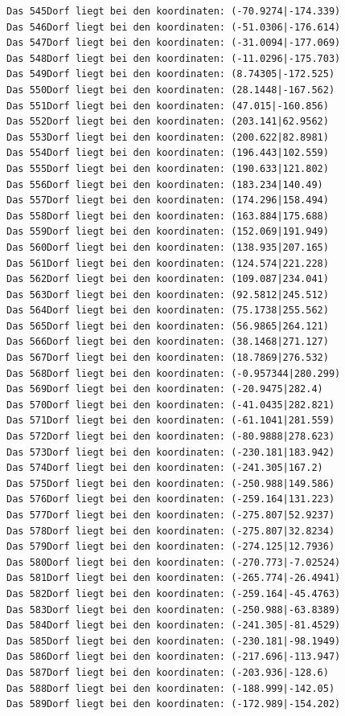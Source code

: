 \documentclass{article}
\begin{document}
\begin{verbatim}
Das 545Dorf liegt bei den koordinaten: (-70.9274|-174.339)
Das 546Dorf liegt bei den koordinaten: (-51.0306|-176.614)
Das 547Dorf liegt bei den koordinaten: (-31.0094|-177.069)
Das 548Dorf liegt bei den koordinaten: (-11.0296|-175.703)
Das 549Dorf liegt bei den koordinaten: (8.74305|-172.525)
Das 550Dorf liegt bei den koordinaten: (28.1448|-167.562)
Das 551Dorf liegt bei den koordinaten: (47.015|-160.856)
Das 552Dorf liegt bei den koordinaten: (203.141|62.9562)
Das 553Dorf liegt bei den koordinaten: (200.622|82.8981)
Das 554Dorf liegt bei den koordinaten: (196.443|102.559)
Das 555Dorf liegt bei den koordinaten: (190.633|121.802)
Das 556Dorf liegt bei den koordinaten: (183.234|140.49)
Das 557Dorf liegt bei den koordinaten: (174.296|158.494)
Das 558Dorf liegt bei den koordinaten: (163.884|175.688)
Das 559Dorf liegt bei den koordinaten: (152.069|191.949)
Das 560Dorf liegt bei den koordinaten: (138.935|207.165)
Das 561Dorf liegt bei den koordinaten: (124.574|221.228)
Das 562Dorf liegt bei den koordinaten: (109.087|234.041)
Das 563Dorf liegt bei den koordinaten: (92.5812|245.512)
Das 564Dorf liegt bei den koordinaten: (75.1738|255.562)
Das 565Dorf liegt bei den koordinaten: (56.9865|264.121)
Das 566Dorf liegt bei den koordinaten: (38.1468|271.127)
Das 567Dorf liegt bei den koordinaten: (18.7869|276.532)
Das 568Dorf liegt bei den koordinaten: (-0.957344|280.299)
Das 569Dorf liegt bei den koordinaten: (-20.9475|282.4)
Das 570Dorf liegt bei den koordinaten: (-41.0435|282.821)
Das 571Dorf liegt bei den koordinaten: (-61.1041|281.559)
Das 572Dorf liegt bei den koordinaten: (-80.9888|278.623)
Das 573Dorf liegt bei den koordinaten: (-230.181|183.942)
Das 574Dorf liegt bei den koordinaten: (-241.305|167.2)
Das 575Dorf liegt bei den koordinaten: (-250.988|149.586)
Das 576Dorf liegt bei den koordinaten: (-259.164|131.223)
Das 577Dorf liegt bei den koordinaten: (-275.807|52.9237)
Das 578Dorf liegt bei den koordinaten: (-275.807|32.8234)
Das 579Dorf liegt bei den koordinaten: (-274.125|12.7936)
Das 580Dorf liegt bei den koordinaten: (-270.773|-7.02524)
Das 581Dorf liegt bei den koordinaten: (-265.774|-26.4941)
Das 582Dorf liegt bei den koordinaten: (-259.164|-45.4763)
Das 583Dorf liegt bei den koordinaten: (-250.988|-63.8389)
Das 584Dorf liegt bei den koordinaten: (-241.305|-81.4529)
Das 585Dorf liegt bei den koordinaten: (-230.181|-98.1949)
Das 586Dorf liegt bei den koordinaten: (-217.696|-113.947)
Das 587Dorf liegt bei den koordinaten: (-203.936|-128.6)
Das 588Dorf liegt bei den koordinaten: (-188.999|-142.05)
Das 589Dorf liegt bei den koordinaten: (-172.989|-154.202)

\end{verbatim}
\end{document}
